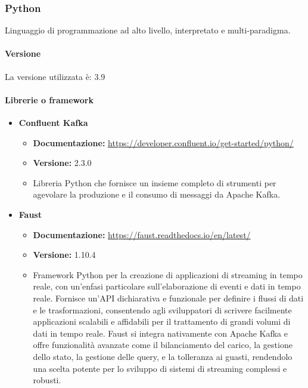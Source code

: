 \subsubsection{Python}
Linguaggio di programmazione ad alto livello, interpretato e multi-paradigma.
\paragraph{Versione}
La versione utilizzata è: 3.9

\paragraph{Librerie o framework}

\begin{itemize}
    \item \textbf{Confluent Kafka}
    \begin{itemize}
        \item \textbf{Documentazione:} \href{https://developer.confluent.io/get-started/python/}{https://developer.confluent.io/get-started/python/}
        \item \textbf{Versione:} 2.3.0
        \item Libreria Python che fornisce un insieme completo di strumenti per agevolare la produzione e il consumo di messaggi da Apache Kafka.
    \end{itemize}
    
    \item \textbf{Faust}
    \begin{itemize}
        \item \textbf{Documentazione:} \href{https://faust.readthedocs.io/en/latest/}{https://faust.readthedocs.io/en/latest/}
        \item \textbf{Versione:} 1.10.4
        \item Framework Python per la creazione di applicazioni di streaming in tempo reale, con un'enfasi particolare sull'elaborazione di eventi e dati in tempo reale. Fornisce un'API dichiarativa e funzionale per definire i flussi di dati e le trasformazioni, consentendo agli sviluppatori di scrivere facilmente applicazioni scalabili e affidabili per il trattamento di grandi volumi di dati in tempo reale. Faust si integra nativamente con Apache Kafka e offre funzionalità avanzate come il bilanciamento del carico, la gestione dello stato, la gestione delle query, e la tolleranza ai guasti, rendendolo una scelta potente per lo sviluppo di sistemi di streaming complessi e robusti.
    \end{itemize}
    

\end{itemize}
